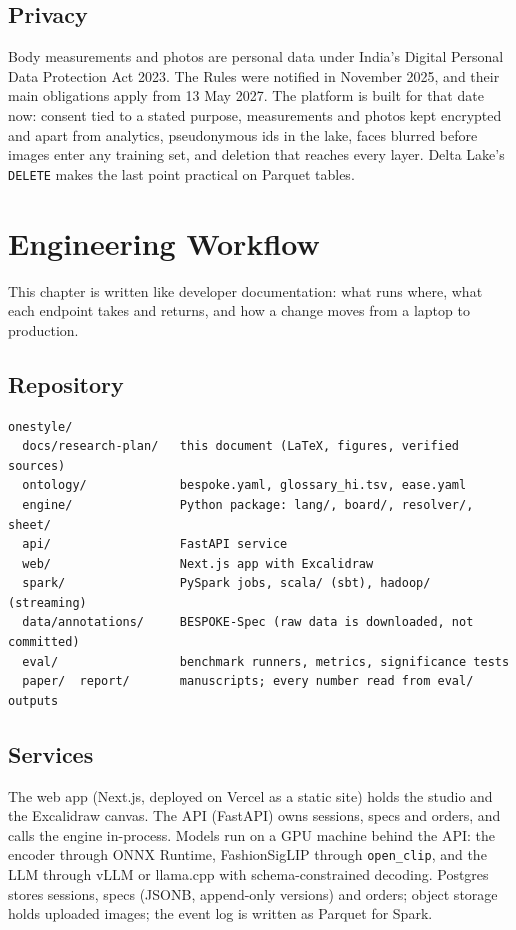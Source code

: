 \section{Privacy}

Body measurements and photos are personal data under India's Digital Personal Data Protection Act 2023. The Rules were notified in November 2025, and their main obligations apply from 13 May 2027. The platform is built for that date now: consent tied to a stated purpose, measurements and photos kept encrypted and apart from analytics, pseudonymous ids in the lake, faces blurred before images enter any training set, and deletion that reaches every layer. Delta Lake's \texttt{DELETE} makes the last point practical on Parquet tables.

\chapter{Engineering Workflow}\label{ch:eng}

This chapter is written like developer documentation: what runs where, what each endpoint takes and returns, and how a change moves from a laptop to production.

\section{Repository}

\begin{lstlisting}
onestyle/
  docs/research-plan/   this document (LaTeX, figures, verified sources)
  ontology/             bespoke.yaml, glossary_hi.tsv, ease.yaml
  engine/               Python package: lang/, board/, resolver/, sheet/
  api/                  FastAPI service
  web/                  Next.js app with Excalidraw
  spark/                PySpark jobs, scala/ (sbt), hadoop/ (streaming)
  data/annotations/     BESPOKE-Spec (raw data is downloaded, not committed)
  eval/                 benchmark runners, metrics, significance tests
  paper/  report/       manuscripts; every number read from eval/ outputs
\end{lstlisting}

\section{Services}

The web app (Next.js, deployed on Vercel as a static site) holds the studio and the Excalidraw canvas. The API (FastAPI) owns sessions, specs and orders, and calls the engine in-process. Models run on a GPU machine behind the API: the encoder through ONNX Runtime, FashionSigLIP through \texttt{open\_clip}, and the LLM through vLLM or llama.cpp with schema-constrained decoding. Postgres stores sessions, specs (JSONB, append-only versions) and orders; object storage holds uploaded images; the event log is written as Parquet for Spark.

